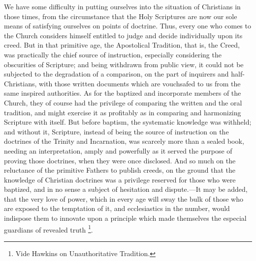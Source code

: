 We have some difficulty in putting ourselves into the situation of
Christians in those times, from the circumstance that the Holy
Scriptures are now our sole means of satisfying ourselves on points of
doctrine. Thus, every one who comes to the Church considers himself
entitled to judge and decide individually upon its creed. But in that
primitive age, the Apostolical Tradition, that is, the Creed,
was practically the chief source of instruction, especially
considering the obscurities of Scripture; and being withdrawn from
public view, it could not be subjected to the degradation of a
comparison, on the part of inquirers and half-Christians, with those
written documents which are vouchsafed to us from the same inspired
authorities. As for the baptized and incorporate members of the
Church, they of course had the privilege of comparing the written and
the oral tradition, and might exercise it as profitably as in
comparing and harmonizing Scripture with itself. But before baptism,
the systematic knowledge was withheld; and without it, Scripture,
instead of being the source of instruction on the doctrines of the
Trinity and Incarnation, was scarcely more than a sealed book, needing
an interpretation, amply and powerfully as it served the purpose of
proving those doctrines, when they were once disclosed. And so much on
the reluctance of the primitive Fathers to publish creeds, on the
ground that the knowledge of Christian doctrines was a privilege
reserved for those who were baptized, and in no sense a subject of
hesitation and dispute.—It may be added, that the very love of
power, which in every age will sway the bulk of those who are exposed
to the temptation of it, and ecclesiastics in the number, would
indispose them to innovate upon a principle which made themselves the
especial guardians of revealed truth \footnote{Vide Hawkins on Unauthoritative Tradition.}.


